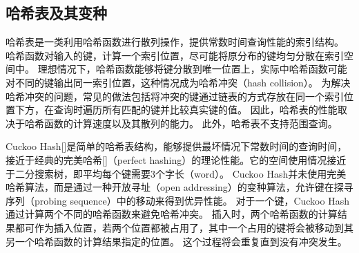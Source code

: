 \subsection{哈希表及其变种}

哈希表是一类利用哈希函数进行散列操作，提供常数时间查询性能的索引结构。
哈希函数对输入的键，计算一个索引位置，尽可能将原分布的键均匀分散在索引空间中。
理想情况下，哈希函数能够将键分散到唯一位置上，实际中哈希函数可能对不同的键输出同一索引位置，这种情况成为哈希冲突（hash collision）。
为解决哈希冲突的问题，常见的做法包括将冲突的键通过链表的方式存放在同一个索引位置下方，在查询时遍历所有匹配的键并比较真实键的值。
因此，哈希表的性能取决于哈希函数的计算速度以及其散列的能力。
此外，哈希表不支持范围查询。


Cuckoo Hash[]是简单的哈希表结构，能够提供最坏情况下常数时间的查询时间，接近于经典的完美哈希[]（perfect hashing）的理论性能。它的空间使用情况接近于二分搜索树，即平均每个键需要3个字长（word）。
Cuckoo Hash并未使用完美哈希算法，而是通过一种开放寻址（open addressing）的变种算法，允许键在探寻序列（probing sequence）中的移动来得到优异性能。
对于一个键，Cuckoo Hash通过计算两个不同的哈希函数来避免哈希冲突。
插入时，两个哈希函数的计算结果都可作为插入位置，若两个位置都被占用了，其中一个占用的键将会被移动到其另一个哈希函数的计算结果指定的位置。
这个过程将会重复直到没有冲突发生。

